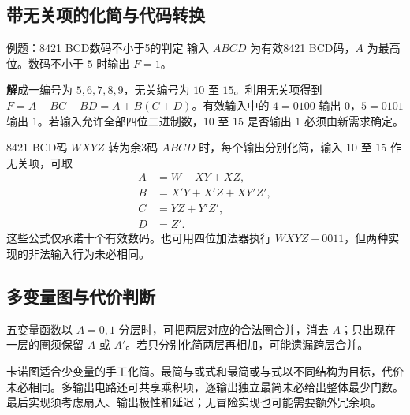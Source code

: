 \documentclass[UTF8,fontset=none,zihao=-4,a4paper]{ctexart}
\newcommand{\sol}{\par\noindent\textbf{解}\quad}
\begin{document}
\subsection{带无关项的化简与代码转换}
\begin{infobox}{例题：8421 BCD数码不小于5的判定}
输入 $ABCD$ 为有效8421 BCD码，$A$ 为最高位。数码不小于 $5$ 时输出 $F=1$。
\end{infobox}
\sol 成一编号为 $5,6,7,8,9$，无关编号为 $10$ 至 $15$。利用无关项得到 $F=A+BC+BD=A+B(C+D)$。有效输入中的 $4=0100$ 输出 $0$，$5=0101$ 输出 $1$。若输入允许全部四位二进制数，$10$ 至 $15$ 是否输出 $1$ 必须由新需求确定。

8421 BCD码 $WXYZ$ 转为余3码 $ABCD$ 时，每个输出分别化简，输入 $10$ 至 $15$ 作无关项，可取
\begin{align*}
A&=W+XY+XZ,\\
B&=X'Y+X'Z+XY'Z',\\
C&=YZ+Y'Z',\\
D&=Z'.
\end{align*}
这些公式仅承诺十个有效数码。也可用四位加法器执行 $WXYZ+0011$，但两种实现的非法输入行为未必相同。

\subsection{多变量图与代价判断}
五变量函数以 $A=0,1$ 分层时，可把两层对应的合法圈合并，消去 $A$；只出现在一层的圈须保留 $A$ 或 $A'$。若只分别化简两层再相加，可能遗漏跨层合并。

卡诺图适合少变量的手工化简。最简与或式和最简或与式以不同结构为目标，代价未必相同。多输出电路还可共享乘积项，逐输出独立最简未必给出整体最少门数。最后实现须考虑扇入、输出极性和延迟；无冒险实现也可能需要额外冗余项。
\end{document}
